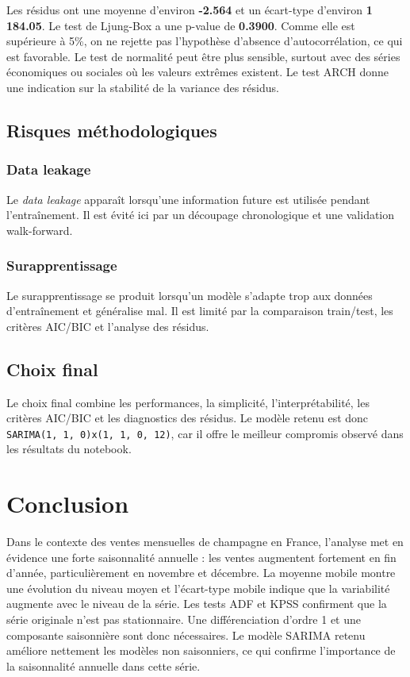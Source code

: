 \documentclass[12pt,a4paper]{report}
\begin{document}
Les résidus ont une moyenne d'environ \textbf{-2.564} et un écart-type d'environ \textbf{1 184.05}. Le test de Ljung-Box a une p-value de \textbf{0.3900}. Comme elle est supérieure à 5\%, on ne rejette pas l'hypothèse d'absence d'autocorrélation, ce qui est favorable. Le test de normalité peut être plus sensible, surtout avec des séries économiques ou sociales où les valeurs extrêmes existent. Le test ARCH donne une indication sur la stabilité de la variance des résidus.

\section{Risques méthodologiques}
\subsection{Data leakage}
Le \textit{data leakage} apparaît lorsqu'une information future est utilisée pendant l'entraînement. Il est évité ici par un découpage chronologique et une validation walk-forward.

\subsection{Surapprentissage}
Le surapprentissage se produit lorsqu'un modèle s'adapte trop aux données d'entraînement et généralise mal. Il est limité par la comparaison train/test, les critères AIC/BIC et l'analyse des résidus.

\section{Choix final}
Le choix final combine les performances, la simplicité, l'interprétabilité, les critères AIC/BIC et les diagnostics des résidus. Le modèle retenu est donc \texttt{SARIMA(1, 1, 0)x(1, 1, 0, 12)}, car il offre le meilleur compromis observé dans les résultats du notebook.

\chapter{Conclusion}
Dans le contexte des ventes mensuelles de champagne en France, l'analyse met en évidence une forte saisonnalité annuelle : les ventes augmentent fortement en fin d'année, particulièrement en novembre et décembre. La moyenne mobile montre une évolution du niveau moyen et l'écart-type mobile indique que la variabilité augmente avec le niveau de la série. Les tests ADF et KPSS confirment que la série originale n'est pas stationnaire. Une différenciation d'ordre 1 et une composante saisonnière sont donc nécessaires. Le modèle SARIMA retenu améliore nettement les modèles non saisonniers, ce qui confirme l'importance de la saisonnalité annuelle dans cette série.
\end{document}
